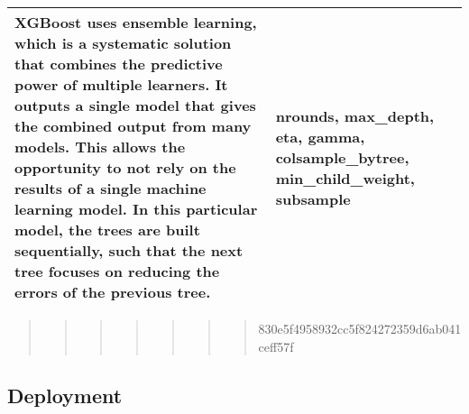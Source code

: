 \documentclass[11pt,]{article}
\begin{document}
\begin{longtable}[]{@{}lll@{}}
\begin{minipage}[t]{0.73\columnwidth}
XGBoost uses ensemble learning, which is a systematic solution that
combines the predictive power of multiple learners. It outputs a single
model that gives the combined output from many models. This allows the
opportunity to not rely on the results of a single machine learning
model. In this particular model, the trees are built sequentially, such
that the next tree focuses on reducing the errors of the previous
tree.\strut
\end{minipage} & \begin{minipage}[t]{0.13\columnwidth}\raggedright
nrounds, max\_depth, eta, gamma, colsample\_bytree, min\_child\_weight,
subsample\strut
\end{minipage}\tabularnewline
\bottomrule
\end{longtable}

\begin{quote}
\begin{quote}
\begin{quote}
\begin{quote}
\begin{quote}
\begin{quote}
\begin{quote}
830e5f4958932cc5f824272359d6ab041ceff57f
\end{quote}
\end{quote}
\end{quote}
\end{quote}
\end{quote}
\end{quote}
\end{quote}

\hypertarget{deployment}{%
\subsection{Deployment}\label{deployment}}
\end{document}
